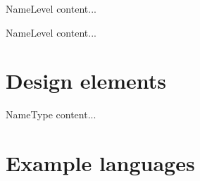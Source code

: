 		\begin{concerns}{Name}{Level}
			content...
		\end{concerns}
	
		\begin{concerns}{Name}{Level}
			content...
		\end{concerns}
	\section{Design elements} \label{s:context-viewpoint-template:design-elements}
		\begin{comment}
			Design entities: actors—external active elements interacting with the design subject, including users, other
			stakeholders and external systems, or other items; services—also called use cases; and directed information
			flows between the design subject, treated as a black box, and its actors associating actors with services.
			Flows capture the expected information content exchanged.
			
			Design relationships: receive output and provide input (between actors and the design subject).
			
			Design constraints: qualities of service; form and medium of interaction (provided to and received from)
			with environment.
		\end{comment}
	
		\begin{design-element}{Name}{Type}
			content...
		\end{design-element}
	\section{Example languages} \label{s:context-viewpoint-template:example-languages}
		\begin{comment}
			Any black-box type diagrams can be used to realize the Context viewpoint. Appropriate languages include
			Structured Analysis [e.g., IDEF0 (IEEE Std 1320.1-1998 [B18]), Structured Analysis and Design 
			Technique (SADT) (Ross [B32]) or those of the DeMarco or Gane-Sarson variety], the Cleanroom’s black
			box diagrams, and UML use cases (OMG [B28]).
		\end{comment}